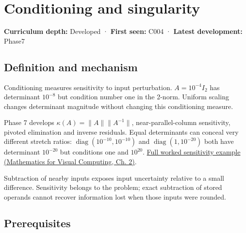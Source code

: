 \hypertarget{appendix-8f6a01f284a7}{}\label{referencestart:appendix-8f6a01f284a7}
\section{Conditioning and singularity}\label{appendix-8f6a01f284a7-conditioning-and-singularity}

\hypertarget{appendix-8f6a01f284a7-conditioning-and-singularity}{}

\textbf{Curriculum depth:} Developed · \textbf{First seen:} C004 · \textbf{Latest development:} Phase7

\begin{allmightroledefinition}

\subsection{Definition and mechanism}\label{appendix-8f6a01f284a7-definition-and-mechanism}

\hypertarget{appendix-8f6a01f284a7-definition-and-mechanism}{}

Conditioning measures sensitivity to input perturbation. \(A=10^{-4}I_2\) has determinant \(10^{-8}\) but condition number one in the 2-norm. Uniform scaling changes determinant magnitude without changing this conditioning measure.

\end{allmightroledefinition}

Phase 7 develops \(\kappa(A)=\|A\|\|A^{-1}\|\), near-parallel-column sensitivity, pivoted elimination and inverse residuals. Equal determinants can conceal very different stretch ratios: \(\operatorname{diag}(10^{-10},10^{-10})\) and \(\operatorname{diag}(1,10^{-20})\) both have determinant \(10^{-20}\) but conditions one and \(10^{20}\). \href{../02-Mathematics-for-Visual-Computing/main.pdf\#nameddest=01-foundations-i-ch018-an-inverse-can-exist-and-still-amplify-uncertainty}{Full worked sensitivity example (Mathematics for Visual Computing, Ch. 2)}.

Subtraction of nearby inputs exposes input uncertainty relative to a small difference. Sensitivity belongs to the problem; exact subtraction of stored operands cannot recover information lost when those inputs were rounded.

\subsection{Prerequisites}\label{appendix-8f6a01f284a7-prerequisites}

